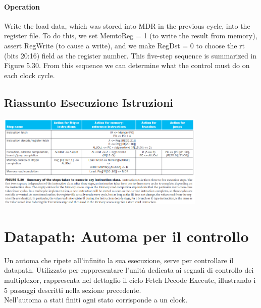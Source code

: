 \documentclass[12pt, a4paper, openany]{book}
\begin{document}
\paragraph*{Operation} Write the load data, which was stored into MDR in the previous cycle,
into the register file. To do this, we set MemtoReg = 1 (to write the result from
memory), assert RegWrite (to cause a write), and we make RegDst = 0 to choose
the rt (bits 20:16) field as the register number.
This five-step sequence is summarized in Figure 5.30. From this sequence we
can determine what the control must do on each clock cycle.

\subsection{Riassunto Esecuzione Istruzioni}
\begin{center}
    \includegraphics[width=100mm, scale=0.5]{Tabella Esecuzione Istruzioni.png}
\end{center}
\section{Datapath: Automa per il controllo}
Un automa che ripete all'infinito la sua esecuzione, serve per controllare il datapath.
Utilizzato per rappresentare l'unità dedicata ai segnali di controllo dei multiplexor,
rappresenta nel dettaglio il ciclo Fetch Decode Execute, illustrando i 5 passaggi descritti
nella sezione precedente.
\\ Nell'automa a stati finiti ogni stato corrisponde a un clock.
\end{document}
